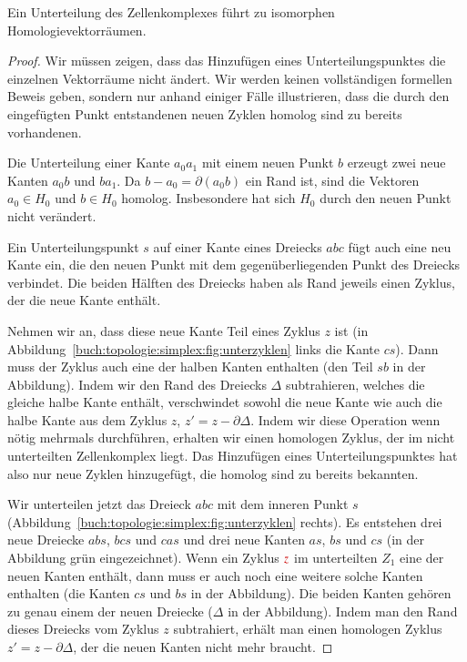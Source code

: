 \begin{satz}
\label{buch:topologie:eulercharakteristik:satz:homologieunterteilung}
Ein Unterteilung des Zellenkomplexes führt zu isomorphen
Homologievektorräumen.
\end{satz}

\begin{proof}
%
Wir müssen zeigen, dass das Hinzufügen eines Unterteilungspunktes 
die einzelnen Vektorräume nicht ändert.
Wir werden keinen vollständigen formellen Beweis geben, sondern
nur anhand einiger Fälle illustrieren, dass die durch den eingefügten
Punkt entstandenen neuen Zyklen homolog sind zu bereits vorhandenen.

Die Unterteilung einer Kante $a_0a_1$ mit einem neuen Punkt $b$ erzeugt
zwei neue Kanten $a_0b$ und $ba_1$.
Da $b-a_0=\partial (a_0b)$ ein Rand ist, sind die Vektoren $a_0\in H_0$
und $b\in H_0$ homolog.
Insbesondere hat sich $H_0$ durch den neuen Punkt nicht verändert.

Ein Unterteilungspunkt $s$ auf einer Kante eines Dreiecks $abc$ fügt auch
eine neu Kante ein, die den neuen Punkt mit dem gegenüberliegenden
Punkt des Dreiecks verbindet.
Die beiden Hälften des Dreiecks haben als Rand jeweils einen Zyklus,
der die neue Kante enthält.

Nehmen wir an, dass diese neue Kante Teil eines Zyklus $z$ ist
(in Abbildung~\ref{buch:topologie:simplex:fig:unterzyklen} links
die Kante $cs$).
Dann muss der Zyklus auch eine der halben Kanten enthalten (den
Teil $sb$ in der Abbildung).
Indem wir den Rand des Dreiecks $\Delta$ subtrahieren, welches die gleiche
halbe Kante enthält, verschwindet sowohl die neue Kante wie auch die
halbe Kante aus dem Zyklus $z$, $z'=z-\partial\Delta$.
Indem wir diese Operation wenn nötig mehrmals durchführen, erhalten
wir einen homologen Zyklus, der im nicht unterteilten Zellenkomplex
liegt.
Das Hinzufügen eines Unterteilungspunktes hat also nur neue Zyklen
hinzugefügt, die homolog sind zu bereits bekannten.

Wir unterteilen jetzt das Dreieck $abc$ mit dem inneren Punkt $s$
(Abbildung~\ref{buch:topologie:simplex:fig:unterzyklen} rechts).
Es entstehen drei neue Dreiecke $abs$, $bcs$ und $cas$ und drei neue
Kanten $as$, $bs$ und $cs$ (in der Abbildung {\color{darkgreen}grün}
eingezeichnet).
Wenn ein Zyklus ${\color{darkred}z}$ im unterteilten $Z_1$ eine der
neuen Kanten enthält, dann muss er auch noch eine weitere solche
Kanten enthalten (die Kanten $cs$ und $bs$ in der Abbildung).
Die beiden Kanten gehören zu genau einem der neuen Dreiecke ($\Delta$
in der Abbildung).
Indem man den Rand dieses Dreiecks vom Zyklus $z$ subtrahiert, erhält
man einen homologen Zyklus $z'=z-\partial\Delta$, der die neuen Kanten
nicht mehr braucht.


\end{proof}
